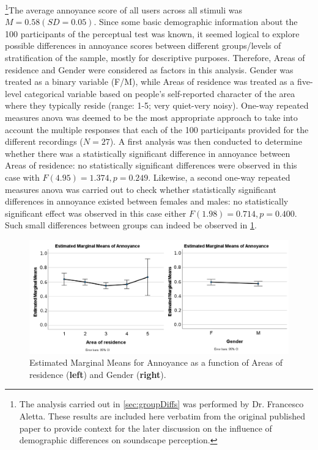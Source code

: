 \footnote{The analysis carried out in \cref{sec:groupDiffs} was performed by Dr. Francesco Aletta. These results are included here verbatim from the original published paper to provide context for the later discussion on the influence of demographic differences on soundscape perception.}The average annoyance score of all users across all stimuli was $M=0.58 (SD=0.05)$. Since some basic demographic information about the 100 participants of the perceptual test was known, it seemed logical to explore possible differences in annoyance scores between different groups/levels of stratification of the sample, mostly for descriptive purposes. Therefore, Areas of residence and Gender were considered as factors in this analysis. Gender was treated as a binary variable (F/M), while Areas of residence was treated as a five-level categorical variable based on people's self-reported character of the area where they typically reside (range: 1-5; very quiet-very noisy). One-way repeated measures \gls{anova} was deemed to be the most appropriate approach to take into account the multiple responses that each of the 100 participants provided for the different recordings ($N=27$). A first analysis was then conducted to determine whether there was a statistically significant difference in annoyance between Areas of residence: no statistically significant differences were observed in this case with $F(4.95)=1.374, p=0.249$. Likewise, a second one-way repeated measures \gls{anova} was carried out to check whether statistically significant differences in annoyance existed between females and males: no statistically significant effect was observed in this case either $F(1.98)=0.714, p=0.400$. Such small differences between groups can indeed be observed in \cref{fig:anova}.

\begin{figure}[h]
  \centering
  \includegraphics[width=\textwidth]{Figures/orga_anovas.png}
  \caption{Estimated Marginal Means for Annoyance as a function of Areas of residence (\textbf{left}) and Gender (\textbf{right}). \label{fig:anova}
}
\end{figure}

